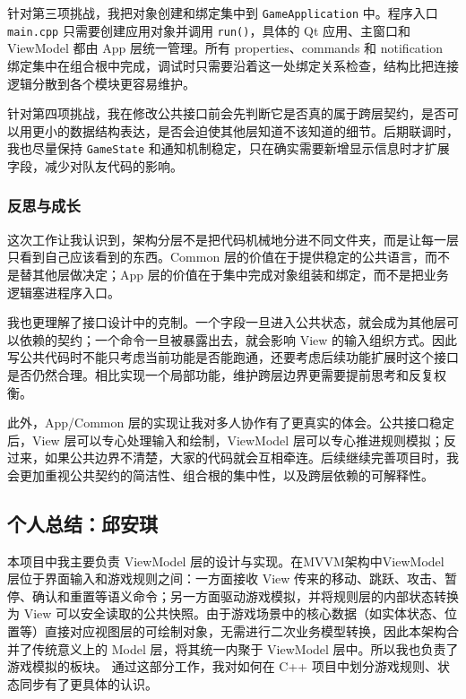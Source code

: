 \documentclass[a4paper]{article}
\begin{document}
\begin{enumerate}
    针对第三项挑战，我把对象创建和绑定集中到 \texttt{GameApplication} 中。程序入口 \texttt{main.cpp} 只需要创建应用对象并调用 \texttt{run()}，具体的 Qt 应用、主窗口和 ViewModel 都由 App 层统一管理。所有 properties、commands 和 notification 绑定集中在组合根中完成，调试时只需要沿着这一处绑定关系检查，结构比把连接逻辑分散到各个模块更容易维护。

    针对第四项挑战，我在修改公共接口前会先判断它是否真的属于跨层契约，是否可以用更小的数据结构表达，是否会迫使其他层知道不该知道的细节。后期联调时，我也尽量保持 \texttt{GameState} 和通知机制稳定，只在确实需要新增显示信息时才扩展字段，减少对队友代码的影响。
\end{enumerate}

\subsubsection{反思与成长}

这次工作让我认识到，架构分层不是把代码机械地分进不同文件夹，而是让每一层只看到自己应该看到的东西。Common 层的价值在于提供稳定的公共语言，而不是替其他层做决定；App 层的价值在于集中完成对象组装和绑定，而不是把业务逻辑塞进程序入口。

我也更理解了接口设计中的克制。一个字段一旦进入公共状态，就会成为其他层可以依赖的契约；一个命令一旦被暴露出去，就会影响 View 的输入组织方式。因此写公共代码时不能只考虑当前功能是否能跑通，还要考虑后续功能扩展时这个接口是否仍然合理。相比实现一个局部功能，维护跨层边界更需要提前思考和反复权衡。

此外，App/Common 层的实现让我对多人协作有了更真实的体会。公共接口稳定后，View 层可以专心处理输入和绘制，ViewModel 层可以专心推进规则模拟；反过来，如果公共边界不清楚，大家的代码就会互相牵连。后续继续完善项目时，我会更加重视公共契约的简洁性、组合根的集中性，以及跨层依赖的可解释性。

\subsection{个人总结：邱安琪}

本项目中我主要负责 ViewModel 层的设计与实现。在MVVM架构中ViewModel 层位于界面输入和游戏规则之间：一方面接收 View 传来的移动、跳跃、攻击、暂停、确认和重置等语义命令；另一方面驱动游戏模拟，并将规则层的内部状态转换为 View 可以安全读取的公共快照。由于游戏场景中的核心数据（如实体状态、位置等）直接对应视图层的可绘制对象，无需进行二次业务模型转换，因此本架构合并了传统意义上的 Model 层，将其统一内聚于 ViewModel 层中。所以我也负责了游戏模拟的板块。
通过这部分工作，我对如何在 C++ 项目中划分游戏规则、状态同步有了更具体的认识。
\end{document}
